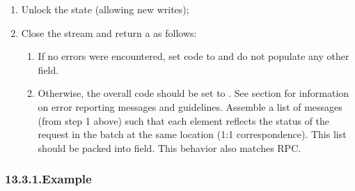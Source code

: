 \documentclass[11pt]{article}
\begin{document}
{\begin{enumerate}
\item{}
Unlock the state (allowing new writes);%

\item{}
Close the  stream and return a  as follows:%

\begin{enumerate}%

\item{}
If no errors were encountered, set code to  and do not populate any
other field.%

\item{}
Otherwise, the overall code should be set to . See section
 for information
on error reporting messages and guidelines. Assemble a list of 
messages (from step 1 above) such that each element reflects the status
of the request in the batch at the same location (1:1
correspondence). This list should be packed into
 field. This behavior also matches 
RPC.%
\end{enumerate}%
\end{enumerate}%

\subsubsection{13.3.1.\hspace*{0.5em}Example}\label{sec-example}%

}
\end{document}
